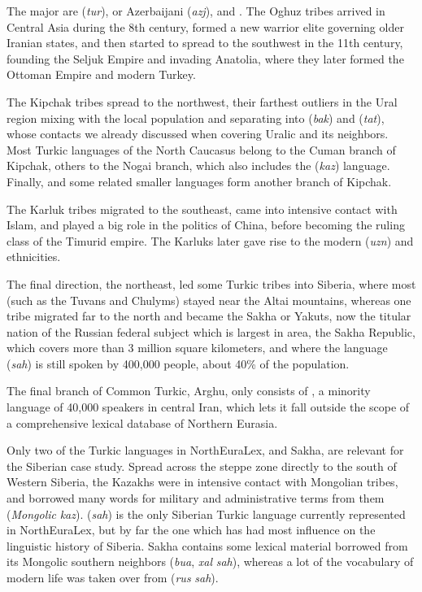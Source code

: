 The major  are  (\textit{tur}),  or Azerbaijani (\textit{azj}), and . The Oghuz tribes arrived in Central Asia during the 8th century, formed a new warrior elite governing older Iranian states, and then started to spread to the southwest in the 11th century, founding the Seljuk Empire and invading Anatolia, where they later formed the Ottoman Empire and modern Turkey.

The Kipchak tribes spread to the northwest, their farthest outliers in the Ural region mixing with the local population and separating into  (\textit{bak}) and  (\textit{tat}), whose contacts we already discussed when covering Uralic and its neighbors. Most Turkic languages of the North Caucasus belong to the Cuman branch of Kipchak, others to the Nogai branch, which also includes the  (\textit{kaz}) language. Finally,  and some related smaller languages form another branch of Kipchak.

The Karluk tribes migrated to the southeast, came into intensive contact with Islam, and played a big role in the politics of China, before becoming the ruling class of the Timurid empire. The Karluks later gave rise to the modern  (\textit{uzn}) and  ethnicities.

The final direction, the northeast, led some Turkic tribes into Siberia, where most (such as the Tuvans and Chulyms) stayed near the Altai mountains, whereas one tribe migrated far to the north and became the Sakha or Yakuts, now the titular nation of the Russian federal subject which is largest in area, the Sakha Republic, which covers more than 3 million square kilometers, and where the  language (\textit{sah}) is still spoken by 400,000 people, about 40\% of the population.

The final branch of Common Turkic, Arghu, only consists of , a minority language of 40,000 speakers in central Iran, which lets it fall outside the scope of a comprehensive lexical database of Northern Eurasia.

Only two of the Turkic languages in NorthEuraLex,  and Sakha, are relevant for the Siberian case study. Spread across the steppe zone directly to the south of Western Siberia, the Kazakhs were in intensive contact with Mongolian tribes, and borrowed many words for military and administrative terms from them (\textit{Mongolic} \arrowLA \textit{kaz}).  (\textit{sah}) is the only Siberian Turkic language currently represented in NorthEuraLex, but by far the one which has had most influence on the linguistic history of Siberia. Sakha contains some lexical material borrowed from its Mongolic southern neighbors (\textit{bua}, \textit{xal} \arrowLA \textit{sah}), whereas a lot of the vocabulary of modern life was taken over from  (\textit{rus} \arrowLA \textit{sah}).

